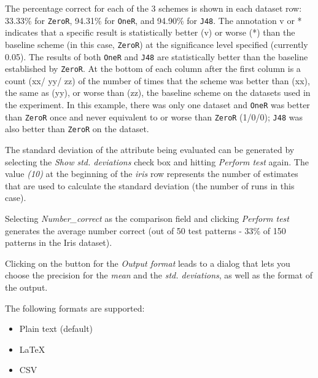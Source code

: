 \documentclass[a4paper]{article}
\begin{document}
The percentage correct for each of the 3 schemes is shown in each dataset row: 33.33\% for \texttt{ZeroR}, 94.31\% for \texttt{OneR}, and 94.90\% for \texttt{J48}. The annotation v or * indicates that a specific result is statistically better (v) or worse (*) than the baseline scheme (in this case, \texttt{ZeroR}) at the significance level specified (currently 0.05). The results of both \texttt{OneR} and \texttt{J48} are statistically better than the baseline established by \texttt{ZeroR}. At the bottom of each column after the first column is a count (xx/ yy/ zz) of the number of times that the scheme was better than (xx), the same as (yy), or worse than (zz), the baseline scheme on the datasets used in the experiment. In this example, there was only one dataset and \texttt{OneR} was better than \texttt{ZeroR} once and never equivalent to or worse than \texttt{ZeroR} (1/0/0); \texttt{J48} was also better than \texttt{ZeroR} on the dataset.

The standard deviation of the attribute being evaluated can be generated by selecting the \textit{Show std. deviations} check box and hitting \textit{Perform test} again. The value \textit{(10)} at the beginning of the \textit{iris} row represents the number of estimates that are used to calculate the standard deviation (the number of runs in this case).

\begin{center}
\end{center}

Selecting \textit{Number\_correct} as the comparison field and clicking \textit{Perform test} generates the average number correct (out of 50 test patterns - 33\% of 150 patterns in the Iris dataset).
\begin{center}
\end{center}

Clicking on the button for the \textit{Output format} leads to a dialog that lets you choose the precision for the \textit{mean} and the \textit{std. deviations}, as well as the format of the output. 

The following formats are supported:

\begin{itemize}
   \item Plain text (default)
   \item LaTeX
   \item CSV
\end{itemize}
\end{document}
